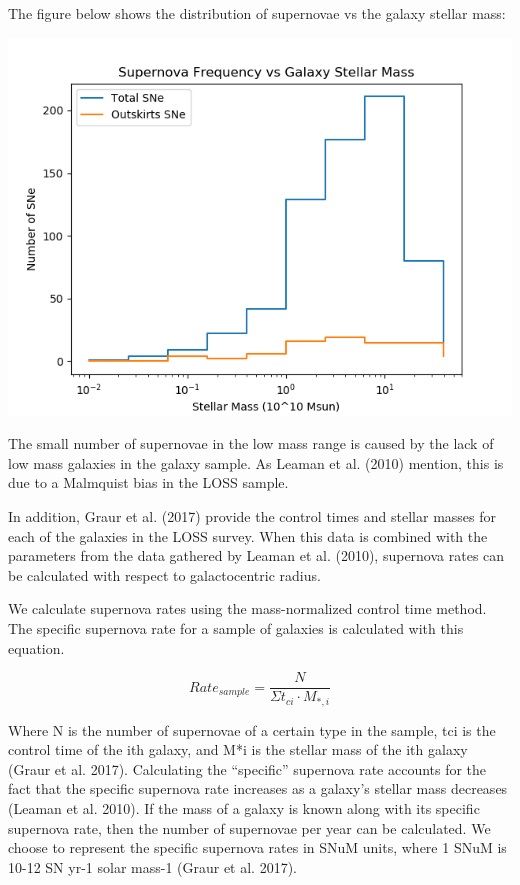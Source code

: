 \documentclass[apj]{emulateapj}
\begin{document}
The figure below shows the distribution of supernovae vs the galaxy stellar mass:

\includegraphics[scale=0.5]{supernova_freq_vs_stellar_mass}

The small number of supernovae in the low mass range is caused by the lack of low mass galaxies in the galaxy sample. As Leaman et al. (2010) mention, this is due to a Malmquist bias in the LOSS sample.

In addition, Graur et al. (2017) provide the control times and stellar masses for each of the galaxies in the LOSS survey. When this data is combined with the parameters from the data gathered by Leaman et al. (2010), supernova rates can be calculated with respect to galactocentric radius.

We calculate supernova rates using the mass-normalized control time method. The specific supernova rate for a sample of galaxies is calculated with this equation.

\begin{equation}
Rate_{sample}=\frac{N}{\Sigma t_{ci} \cdot M_{*, i}}
\end{equation}

Where N is the number of supernovae of a certain type in the sample, tci is the control time of the ith galaxy, and M*i is the stellar mass of the ith galaxy (Graur et al. 2017). Calculating the “specific” supernova rate accounts for the fact that the specific supernova rate increases as a galaxy’s stellar mass decreases (Leaman et al. 2010). If the mass of a galaxy is known along with its specific supernova rate, then the number of supernovae per year can be calculated. We choose to represent the specific supernova rates in SNuM units, where 1 SNuM is 10-12 SN yr-1 solar mass-1 (Graur et al. 2017).
\end{document}
